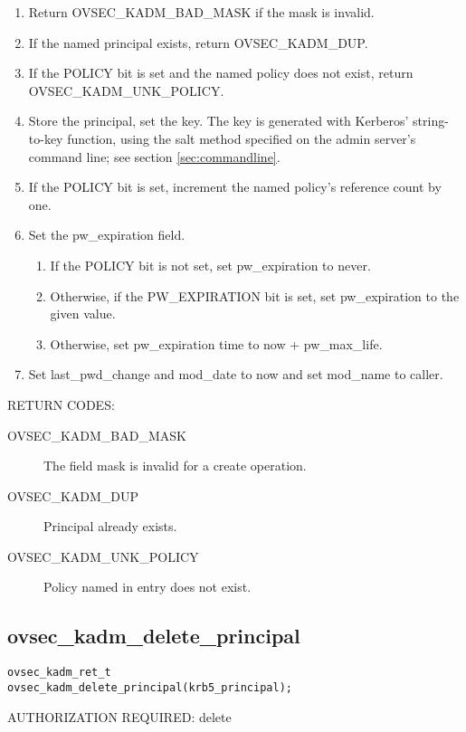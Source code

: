 \begin{enumerate}
\item Return OVSEC_KADM_BAD_MASK if the mask is invalid.
\item If the named principal exists, return OVSEC_KADM_DUP.
\item If the POLICY bit is set and the named policy does not exist,
return OVSEC_KADM_UNK_POLICY.
\item Store the principal, set the key.  The key is generated with
Kerberos' string-to-key function, using the salt method specified on
the admin server's command line; see section \ref{sec:commandline}.
\item If the POLICY bit is set, increment the named policy's reference
count by one.

\item Set the pw_expiration field.
\begin{enumerate}
\item If the POLICY bit is not set, set pw_expiration to never.
\item Otherwise, if the PW_EXPIRATION bit is set, set
pw_expiration to the given value.
\item Otherwise, set pw_expiration time to now + pw_max_life.
\end{enumerate}

\item Set last_pwd_change and mod_date to now and set mod_name to caller.
\end{enumerate}

RETURN CODES:

\begin{description}
\item[OVSEC_KADM_BAD_MASK] The field mask is invalid for a create
operation.
\item[OVSEC_KADM_DUP] Principal already exists.
\item[OVSEC_KADM_UNK_POLICY] Policy named in entry does not exist.
\end{description}

\subsection{ovsec_kadm_delete_principal}

\begin{verbatim}
ovsec_kadm_ret_t
ovsec_kadm_delete_principal(krb5_principal);
\end{verbatim}

AUTHORIZATION REQUIRED: delete 

